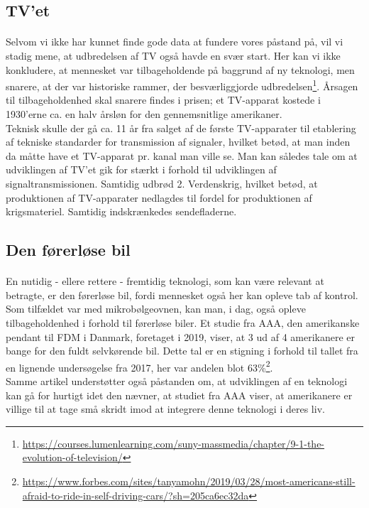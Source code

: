 \documentclass{article}
\begin{document}
\subsection{TV'et}
\paragraph{}
Selvom vi ikke har kunnet finde gode data at fundere vores påstand på, vil vi stadig mene, at udbredelsen af TV også havde en svær start. Her kan vi ikke konkludere, at mennesket var tilbageholdende på baggrund af ny teknologi, men snarere, at der var historiske rammer, der besværliggjorde udbredelsen\footnote{\url{https://courses.lumenlearning.com/suny-massmedia/chapter/9-1-the-evolution-of-television/}}. 
Årsagen til tilbageholdenhed skal snarere findes i prisen; et TV-apparat kostede i 1930'erne ca. en halv årsløn for den gennemsnitlige amerikaner. \\
Teknisk skulle der gå ca. 11 år fra salget af de første TV-apparater til etablering af tekniske standarder for transmission af signaler, hvilket betød, at man inden da måtte have et TV-apparat pr. kanal man ville se. Man kan således tale om at udviklingen af TV'et gik for stærkt i forhold til udviklingen af signaltransmissionen.
Samtidig udbrød 2. Verdenskrig, hvilket betød, at produktionen af TV-apparater nedlagdes til fordel for produktionen af krigsmateriel. Samtidig indskrænkedes sendefladerne. 
\subsection{Den førerløse bil}
\paragraph{}
En nutidig - ellere rettere - fremtidig teknologi, som kan være relevant at betragte, er den førerløse bil, fordi mennesket også her kan opleve tab af kontrol.
Som tilfældet var med mikrobølgeovnen, kan man, i dag, også opleve tilbageholdenhed i forhold til førerløse biler. Et studie fra AAA, den amerikanske pendant
til FDM i Danmark, foretaget i 2019, viser, at 3 ud af 4 amerikanere er bange for den fuldt selvkørende bil.
Dette tal er en stigning i forhold til tallet fra en lignende undersøgelse fra 2017, her var andelen blot 63\%\footnote{\url{https://www.forbes.com/sites/tanyamohn/2019/03/28/most-americans-still-afraid-to-ride-in-self-driving-cars/?sh=205ca6ec32da}}.\\
Samme artikel understøtter også påstanden om, at udviklingen af en teknologi kan gå for hurtigt idet den nævner, at studiet fra AAA viser, at amerikanere er villige til at tage små skridt imod at integrere denne teknologi i deres liv.
\end{document}
